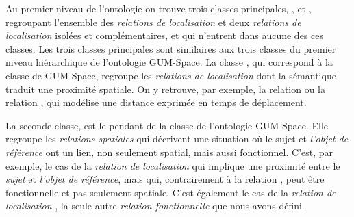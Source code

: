 Au premier niveau de l'ontologie on trouve trois classes principales,
,
 et
,
regroupant l'ensemble des \emph{relations de localisation} et deux
\emph{relations de localisation} isolées et complémentaires,
 et 
qui n'entrent dans aucune des ces classes. Les trois classes
principales sont similaires aux trois classes du premier niveau
hiérarchique de l'ontologie GUM-Space. La classe
, qui
correspond à la classe
 de GUM-Space,
regroupe les \emph{relations de localisation} dont la sémantique
traduit une proximité spatiale. On y retrouve, par exemple, la
relation  ou la relation
, qui modélise une distance exprimée
en temps de déplacement.

La seconde classe,
 est le
pendant de la classe
 de
l'ontologie GUM-Space. Elle regroupe les \emph{relations spatiales}
qui décrivent une situation où le sujet et \emph{l'objet de référence}
ont un lien, non seulement spatial, mais aussi fonctionnel. C'est, par
exemple, le cas de la \emph{relation de localisation}
 qui implique une proximité entre le
\emph{sujet} et \emph{l'objet de référence}, mais qui, contrairement à
la relation , peut être fonctionnelle et pas
seulement spatiale. C'est également le cas de la \emph{relation de
  localisation}
,
la seule autre \emph{relation fonctionnelle} que nous avons défini.

